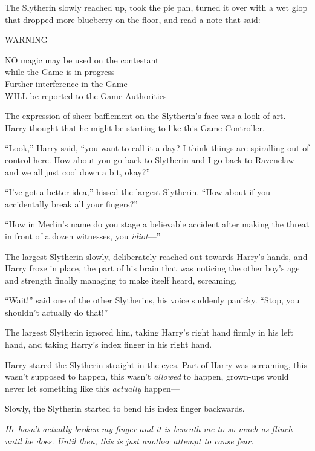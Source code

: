 The Slytherin slowly reached up, took the pie pan, turned it over with a wet glop that dropped more blueberry on the floor, and read a note that said:
\begin{writtenNote}
\MakeUppercase{Warning}

\MakeUppercase{No} magic may be used on the contestant\\
while the Game is in progress\\
Further interference in the Game\\
\MakeUppercase{will} be reported to the Game Authorities
\end{writtenNote}

The expression of sheer bafflement on the Slytherin’s face was a look of art. Harry thought that he might be starting to like this Game Controller.

“Look,” Harry said, “you want to call it a day? I think things are spiralling out of control here. How about you go back to Slytherin and I go back to Ravenclaw and we all just cool down a bit, okay?”

“I’ve got a better idea,” hissed the largest Slytherin. “How about if you accidentally break all your fingers?”

“How in Merlin’s name do you stage a believable accident after making the threat in front of a dozen witnesses, you \emph{idiot}—”

The largest Slytherin slowly, deliberately reached out towards Harry’s hands, and Harry froze in place, the part of his brain that was noticing the other boy’s age and strength finally managing to make itself heard, screaming, 

“Wait!” said one of the other Slytherins, his voice suddenly panicky. “Stop, you shouldn’t actually do that!”

The largest Slytherin ignored him, taking Harry’s right hand firmly in his left hand, and taking Harry’s index finger in his right hand.

Harry stared the Slytherin straight in the eyes. Part of Harry was screaming, this wasn’t supposed to happen, this wasn’t \emph{allowed} to happen, grown-ups would never let something like this \emph{actually} happen—

Slowly, the Slytherin started to bend his index finger backwards.

\emph{He hasn’t actually broken my finger and it is beneath me to so much as flinch until he does. Until then, this is just another attempt to cause fear.}

